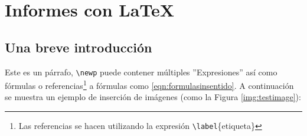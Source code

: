 %
%

\section{Informes con \LaTeX}
	
	\subsection{Una breve introducción}
		
		\lipsum[4]
		
		
		Este es un párrafo, \texttt{\textbackslash newp} puede contener múltiples ''Expresiones'' así como fórmulas o referencias\footnote{Las referencias se hacen utilizando la expresión \texttt{\textbackslash label}\{etiqueta\}} a fórmulas como \eqref{eqn:formulasinsentido}. A continuación se muestra un ejemplo de inserción de imágenes (como la Figura \ref{img:testimage}):
		
